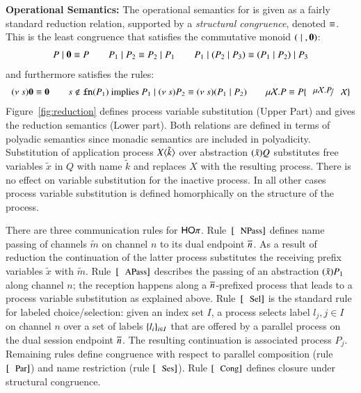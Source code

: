 {\bf Operational Semantics:}
The operational semantics for \HOp is given as a fairly standard reduction relation, supported by
a \emph{structural congruence}, denoted $\equiv$. This is 
the least congruence that satisfies the commutative monoid $(\;|\;, \mathbf{0})$:
%
\[
	\begin{array}{c}
		P \;|\; \mathbf{0} \equiv P
		\qquad
		P_1 \;|\; P_2 \equiv P_2 \;|\; P_1
		\qquad
		P_1 \;|\; (P_2 \;|\; P_3) \equiv (P_1 \;|\; P_2) \;|\; P_3
	\end{array}
\]
%
\noi and furthermore satisfies the rules:
%
\[
\begin{array}{c}
	\news{s} \inact \scong \inact
	\qquad
	s \notin \fn{P_1} \textrm{  implies  } P_1 \Par \news{s} P_2 \scong \news{s}(P_1 \Par P_2)
	\qquad
	\recp{X}{P} \scong P\subst{\recp{X}{P}}{\rvar{X}}
\end{array}
\]
%
\noi Figure~\ref{fig:reduction} defines
process variable substitution (Upper Part) and gives the 
reduction semantics (Lower part).
Both relations are defined in terms of polyadic semantics since
monadic semantics are included in polyadicity.
Substitution of application process $X\langle \tilde{k} \rangle$
over abstraction $(\tilde{x})Q$ substitutes free variables
$\tilde{x}$ in $Q$ with name $\tilde{k}$ and replaces
$X$ with the resulting process.
There is no effect on variable substitution for the inactive process.
In all other cases process variable substitution is defined
homorphically on the structure of the process.



There are three communication rules for $\mathsf{HO}\pi$. 
Rule~$\orule{NPass}$ defines name passing 
of channels $\tilde{m}$ on channel $n$ to its dual endpoint $\overline{n}$.
As a result of reduction the continuation of the 
latter process substitutes the receiving prefix variables $\tilde{x}$
with $\tilde{m}$.
Rule~$\orule{APass}$ describes
the passing of an abstraction $(\tilde{x})P_1$
along channel $n$;
the reception happens along a $\overline{n}$-prefixed process that
leads to a process variable substitution as explained above.
Rule~$\orule{Sel}$ is the standard rule for labeled choice/selection:
given an index set $I$, 
a process selects label $l_j, j \in I$ on channel $n$ over a set of
labels $\{l_i\}_{i \in I}$ that are offered by a parallel process
on the dual session endpoint $\overline{n}$.
The resulting continuation is associated process $P_j$.
Remaining rules define congruence 
with respect to parallel composition (rule $\orule{Par}$)
and name restriction (rule $\orule{Ses}$).
Rule $\orule{Cong}$ defines closure under structural congruence.



